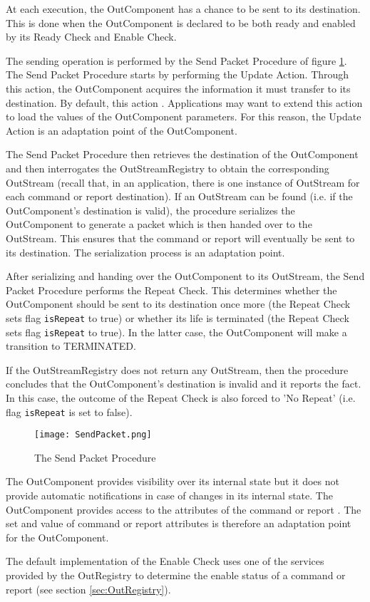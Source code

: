 At each execution, the OutComponent has a chance to be sent to its destination. This is done when the OutComponent is declared to be both ready and enabled by its Ready Check and Enable Check. 

The sending operation is performed by the Send Packet Procedure of figure \ref{fig:SendPacket}. The Send Packet Procedure starts by performing the Update Action. Through this action, the OutComponent acquires the information it must transfer to its destination. By default, this action . Applications may want to extend this action to load the values of the OutComponent parameters. For this reason, the Update Action is an adaptation point of the OutComponent.

The Send Packet Procedure then retrieves the destination of the OutComponent and then interrogates the OutStreamRegistry to obtain the corresponding OutStream (recall that, in an application, there is one instance of OutStream for each command or report destination). If an OutStream can be found (i.e. if the OutComponent's destination is valid), the procedure  serializes the OutComponent to generate a packet which is then handed over to the OutStream. This ensures that the command or report will eventually be sent to its destination. The serialization process is an adaptation point. 

After serializing and handing over the OutComponent to its OutStream, the Send Packet Procedure performs the Repeat Check. This determines whether the OutComponent should be sent to its destination once more (the Repeat Check sets flag \texttt{isRepeat} to true) or whether its life is terminated (the Repeat Check sets flag \texttt{isRepeat} to true). In the latter case, the OutComponent will make a transition to TERMINATED.

If the OutStreamRegistry does not return any OutStream, then the procedure concludes that the OutComponent's destination is invalid and it reports the fact. In this case, the outcome of the Repeat Check is also forced to 'No Repeat' (i.e. flag \texttt{isRepeat} is set to false). 

\begin{figure}[h]
 \centering
 \texttt{[image: SendPacket.png]}
 \caption{The Send Packet Procedure}
 \label{fig:SendPacket}
\end{figure}

The OutComponent provides visibility over its internal state but it does not provide automatic notifications in case of changes in its internal state. The OutComponent provides access to the attributes of the command or report . The set and value of command or report attributes is therefore an adaptation point for the OutComponent. 

The default implementation of the Enable Check uses one of the services provided by the OutRegistry to determine the enable status of a command or report (see section \ref{sec:OutRegistry}).
